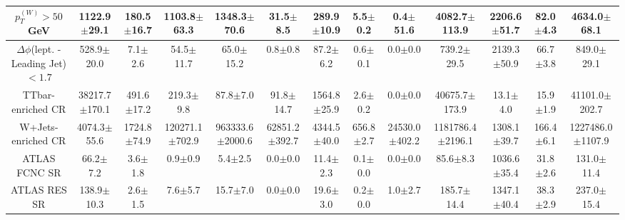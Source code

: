 \documentclass[10pt]{article}
\begin{document}
\begin{table}[p]
\begin{tabular}{|c|c|c|c|c|c|c|c|c|c|c|c|c|}
\hline 
$p_{T}^(W) > 50$ GeV & 1122.9$\pm$29.1 & 180.5$\pm$16.7 & 1103.8$\pm$63.3 & 1348.3$\pm$70.6 & 31.5$\pm$8.5 & 289.9$\pm$10.9 & 5.5$\pm$0.2 & 0.4$\pm$51.6 & 4082.7$\pm$113.9 & 2206.6$\pm$51.7 & 82.0$\pm$4.3 & 4634.0$\pm$68.1\\ 
\hline 
$\Delta\phi$(lept. - Leading Jet) $< 1.7$ & 528.9$\pm$20.0 & 7.1$\pm$2.6 & 54.5$\pm$11.7 & 65.0$\pm$15.2 & 0.8$\pm$0.8 & 87.2$\pm$6.2 & 0.6$\pm$0.1 & 0.0$\pm$0.0 & 739.2$\pm$29.5 & 2139.3$\pm$50.9 & 66.7$\pm$3.8 & 849.0$\pm$29.1\\ 
\hline 
\hline 
TTbar-enriched CR & 38217.7$\pm$170.1 & 491.6$\pm$17.2 & 219.3$\pm$9.8 & 87.8$\pm$7.0 & 91.8$\pm$14.7 & 1564.8$\pm$25.9 & 2.6$\pm$0.2 & 0.0$\pm$0.0 & 40675.7$\pm$173.9 & 13.1$\pm$4.0 & 15.9$\pm$1.9 & 41101.0$\pm$202.7\\ 
\hline 
\hline 
W+Jets-enriched CR & 4074.3$\pm$55.6 & 1724.8$\pm$74.9 & 120271.1$\pm$702.9 & 963333.6$\pm$2000.6 & 62851.2$\pm$392.7 & 4344.5$\pm$40.0 & 656.8$\pm$2.7 & 24530.0$\pm$402.2 & 1181786.4$\pm$2196.1 & 1308.1$\pm$39.7 & 166.4$\pm$6.1 & 1227486.0$\pm$1107.9\\ 
\hline 
\hline 
ATLAS FCNC SR & 66.2$\pm$7.2 & 3.6$\pm$1.8 & 0.9$\pm$0.9 & 5.4$\pm$2.5 & 0.0$\pm$0.0 & 11.4$\pm$2.3 & 0.1$\pm$0.0 & 0.0$\pm$0.0 & 85.6$\pm$8.3 & 1036.6$\pm$35.4 & 31.8$\pm$2.6 & 131.0$\pm$11.4\\ 
\hline 
ATLAS RES SR & 138.9$\pm$10.3 & 2.6$\pm$1.5 & 7.6$\pm$5.7 & 15.7$\pm$7.0 & 0.0$\pm$0.0 & 19.6$\pm$3.0 & 0.2$\pm$0.0 & 1.0$\pm$2.7 & 185.7$\pm$14.4 & 1347.1$\pm$40.4 & 38.3$\pm$2.9 & 237.0$\pm$15.4\\ 
\hline 
\hline 
\hline 
\end{tabular} 
\end{table} 
\end{document}
